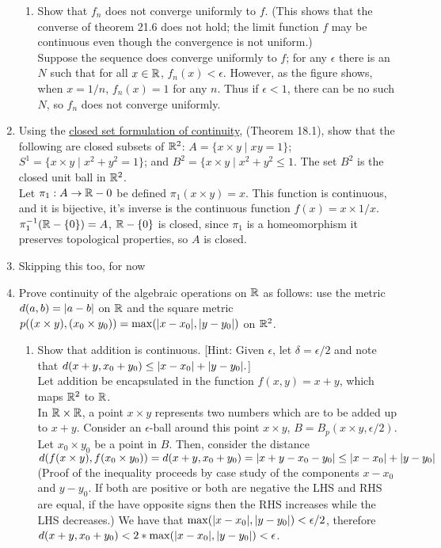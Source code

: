 \documentclass[12pt,letterpaper]{article}
\begin{document}
\begin{enumerate}
\begin{enumerate}
    \item Show that $f_n$ does not converge uniformly to $f$. (This shows that the converse of theorem 21.6 does not hold; the limit function $f$ may be continuous even though the convergence is not uniform.) \\
    Suppose  the sequence does converge uniformly to $f$; for any $\epsilon$ there is an $N$ such that for all $x\in\mathbb{R}$, $f_n(x)<\epsilon$. However, as the figure shows, when $x=1/n$, $f_n(x)=1$ for any $n$. Thus if $\epsilon<1$, there can be no such $N$, so $f_n$ does not converge uniformly.
  \end{enumerate}
  \item Using the \hyperref[dfn:continuous3]{closed set formulation of continuity}, (Theorem 18.1), show that the following are closed subsets of $\mathbb{R}^2$: $A = \{ x\times y\; |\; xy=1\}$; $S^1 = \{ x\times y\;|\; x^2+y^2=1\}$; and $B^2=\{x\times y\;|\;x^2+y^2\leq 1$. The set $B^2$ is the closed unit ball in $\mathbb{R}^2$. \\
  Let $\pi_1: A \rightarrow \mathbb{R} - {0}$ be defined $\pi_1(x\times y) = x$. This function is continuous, and it is bijective, it's inverse is the continuous function $f(x) = x\times 1/x$. $\pi_1^{-1}(\mathbb{R}-\{0\}) = A$, $\mathbb{R} - \{0\}$ is closed, since $\pi_1$ is a homeomorphism it preserves topological properties, so $A$ is closed. \\
  \item Skipping this too, for now
  \item Prove continuity of the algebraic operations on $\mathbb{R}$ as follows: use the metric $d(a,b)=\lvert a-b\rvert$ on $\mathbb{R}$ and the square metric $p((x\times y),(x_0\times y_0)) = \max(\lvert x-x_0\rvert, \lvert y-y_0\rvert)$ on $\mathbb{R}^2$.
  \begin{enumerate}
    \item Show that addition is continuous. [Hint: Given $\epsilon$, let $\delta = \epsilon/2$ and note that $d(x+y, x_0+y_0) \leq \lvert x-x_0\rvert + \lvert y-y_0\rvert.$]\\
    Let addition be encapsulated in the function $f(x,y) = x+y$, which maps $\mathbb{R}^2$ to $\mathbb{R}$. \\
    In $\mathbb{R}\times\mathbb{R}$, a point $x\times y$ represents two numbers which are to be added up to $x+y$. Consider an $\epsilon$-ball around this point $x\times y$, $B=B_p(x\times y, \epsilon/2)$. Let $x_0\times y_0$ be a point in $B$. Then, consider the distance $d(f(x\times y), f(x_0\times y_0)) = d(x+y, x_0+y_0) = \lvert x+y-x_0-y_0\rvert \leq \lvert x-x_0\rvert+\lvert y-y_0\rvert$ (Proof of the inequality proceeds by case study of the components $x-x_0$ and $y-y_0$. If both are positive or both are negative the LHS and RHS are equal, if the have opposite signs then the RHS increases while the LHS decreases.) We have that $\max(\lvert x-x_0\rvert,\lvert y-y_0\rvert)<\epsilon/2$, therefore $d(x+y, x_0+y_0)<2*\max(\lvert x-x_0\rvert,\lvert y-y_0\rvert)<\epsilon$. \\

\end{enumerate}
\end{enumerate}
\end{document}
